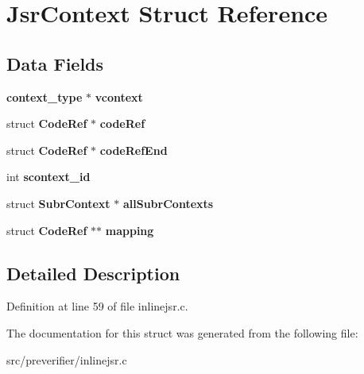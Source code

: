 \section{JsrContext Struct Reference}
\label{struct_jsr_context}
\subsection*{Data Fields}
\begin{DoxyCompactItemize}
\item 
{\bf context\_\-type} $\ast$ {\bfseries vcontext}\label{struct_jsr_context_a6dbb033ee1d09c3bbf224ed2558245eb}

\item 
struct {\bf CodeRef} $\ast$ {\bfseries codeRef}\label{struct_jsr_context_ad46bf4231ed7f32e2f7033c32ee96c00}

\item 
struct {\bf CodeRef} $\ast$ {\bfseries codeRefEnd}\label{struct_jsr_context_a7b431ec9b4d709b6c5dfe3275c016371}

\item 
int {\bfseries scontext\_\-id}\label{struct_jsr_context_ac3a8468a710be4641446519edf5ec479}

\item 
struct {\bf SubrContext} $\ast$ {\bfseries allSubrContexts}\label{struct_jsr_context_aff4d46a8e19381eb6d1553551bc6d6aa}

\item 
struct {\bf CodeRef} $\ast$$\ast$ {\bfseries mapping}\label{struct_jsr_context_ac363ec299a5fe1ff96c29d8ee736c5d0}

\end{DoxyCompactItemize}


\subsection{Detailed Description}


Definition at line 59 of file inlinejsr.c.



The documentation for this struct was generated from the following file:\begin{DoxyCompactItemize}
\item 
src/preverifier/inlinejsr.c\end{DoxyCompactItemize}
